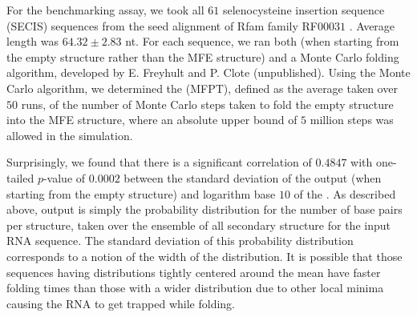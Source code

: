 For the benchmarking assay, we took all $61$ selenocysteine insertion sequence
(SECIS) sequences from the seed alignment of Rfam family RF$00031$
\citep{Gardner.nar11}. Average length was $64.32 \pm 2.83$ nt.
For each sequence, we ran both \fftbor (when starting
from the empty structure rather than the MFE structure) and a Monte Carlo
folding algorithm, developed by E. Freyhult and P. Clote (unpublished).
Using the Monte Carlo algorithm, we
determined the \mfpt (MFPT), defined as the average
taken over $50$ runs, of the number of Monte Carlo steps taken to fold
the empty structure into the MFE structure, where an absolute upper bound
of $5$ million steps was allowed in the simulation.

Surprisingly, we found that there is a significant
correlation of $0.4847$ with one-tailed
$p$-value of $0.0002$ between the
standard deviation of the \fftbor output (when starting from the
empty structure) and logarithm base $10$ of the \mfpt.
As described above, \fftbor output is simply
the probability distribution
for the number of base pairs per structure, taken over the ensemble
of all secondary structure for the input RNA
sequence. The standard deviation of this probability distribution corresponds
to a notion of the width of the distribution. It is possible that those
sequences having distributions tightly centered around the
mean have faster folding times than those with a wider distribution
due to other local minima causing the RNA to get trapped while folding.

